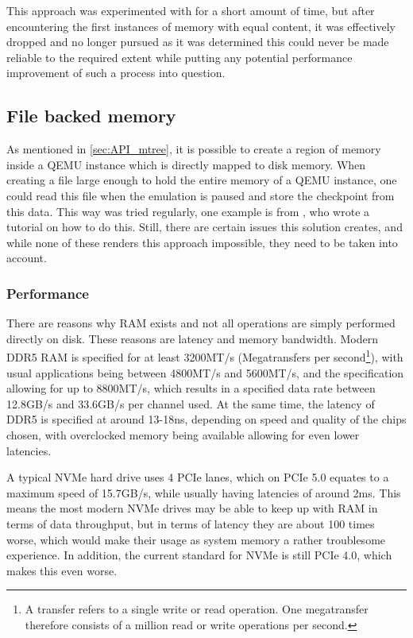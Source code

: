 This approach was experimented with for a short amount of time,
but after encountering the first instances of memory with equal content,
it was effectively dropped and no longer pursued
as it was determined this could never be made reliable to the required extent
while putting any potential performance improvement of such a process into question.

\subsection{File backed memory}
As mentioned in \autoref{sec:API_mtree},
it is possible to create a region of memory inside a QEMU instance
which is directly mapped to disk memory.
When creating a file large enough to hold the entire memory of a QEMU instance,
one could read this file when the emulation is paused and store the checkpoint from this data.
This way was tried regularly, one example is from ,
who wrote a tutorial on how to do this\cite{QEMU_memory_file}.
Still, there are certain issues this solution creates,
and while none of these renders this approach impossible,
they need to be taken into account.

\subsubsection{Performance}
There are reasons why RAM exists and not all operations are simply performed directly on disk.
These reasons are latency and memory bandwidth.
Modern DDR5 RAM is specified for at least 3200MT/s (Megatransfers per second\footnote{A transfer refers to a single write or read operation. One megatransfer therefore consists of a million read or write operations per second.}),
with usual applications being between 4800MT/s and 5600MT/s,
and the specification allowing for up to 8800MT/s,
which results in a specified data rate between 12.8GB/s and 33.6GB/s per channel used.
At the same time, the latency of DDR5 is specified at around 13-18ns,
depending on speed and quality of the chips chosen,
with overclocked memory being available allowing for even lower latencies\cite[p.392-406]{JEDEC}.

A typical NVMe hard drive uses 4 PCIe lanes, which on PCIe 5.0 equates to a maximum speed of 15.7GB/s,
while usually having latencies of around 2ms.
This means the most modern NVMe drives may be able to keep up with RAM in terms of data throughput,
but in terms of latency they are about 100 times worse,
which would make their usage as system memory a rather troublesome experience.
In addition, the current standard for NVMe is still PCIe 4.0, which makes this even worse.

